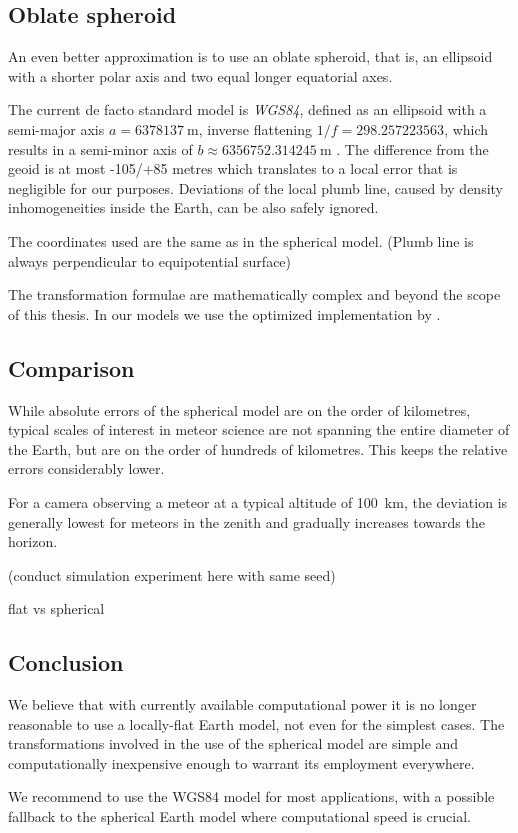     \subsection{Oblate spheroid} \label{mEo}
        An even better approximation is to use an oblate spheroid,
        that is, an ellipsoid with a shorter polar axis and two
        equal longer equatorial axes.

        The current de facto standard model is \emph{WGS84}, defined as an ellipsoid
        with a semi-major axis $a = \SI{6378137}{\metre}$, inverse flattening
        $1/f = \num{298.257223563}$, which results in a semi-minor axis of
        $b \approx \SI{6356752.314245}{\metre}$ \cite{???}.
        The difference from the geoid is at most -105/+85 metres \cite{???}
        which translates to a local error that is negligible for our purposes.
        Deviations of the local plumb line, caused by density inhomogeneities
        inside the Earth, can be also safely ignored.

        The coordinates used are the same as in the spherical model. (Plumb line is always perpendicular to equipotential surface)

        The transformation formulae are mathematically complex and beyond the scope of this thesis.
        In our models we use the optimized implementation by \citet{osen2017}.

    \subsection{Comparison} \label{mEc}
        While absolute errors of the spherical model are on the order of kilometres,
        typical scales of interest in meteor science are not spanning the entire diameter of the Earth,
        but are on the order of hundreds of kilometres. This keeps the relative errors considerably lower.

        For a camera observing a meteor at a typical altitude of \SI{100}{\kilo\metre},
        the deviation is generally lowest for meteors in the zenith
        and gradually increases towards the horizon.

        (conduct simulation experiment here with same seed)

        flat vs spherical

    \subsection{Conclusion}
        We believe that with currently available computational power it is no longer reasonable to
        use a locally-flat Earth model, not even for the simplest cases.
        The transformations involved in the use of the spherical model
        are simple and computationally inexpensive enough to warrant its employment everywhere.

        We recommend to use the WGS84 model for most applications, with a possible
        fallback to the spherical Earth model where computational speed is crucial.
